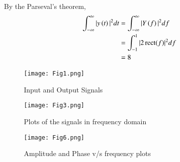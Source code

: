 \documentclass[journal,12pt,twocolumn]{IEEEtran}
\DeclareMathOperator{\rect}{rect}
\begin{document}
By the Parseval's theorem,
\begin{align}
    \int_{-\infty}^{\infty} |y\brak{t}|^{2} dt &= \int_{-\infty}^{\infty} |Y\brak{f}|^{2} df\\
    &= \int_{-1}^{1} |2\rect(f)|^2df\\
    &= 8
\end{align}
\begin{figure}[htp]
    \centering
    \texttt{[image: Fig1.png]}
    \caption{Input and Output Signals}
    \label{fig:plot}
\end{figure}
\begin{figure}[htp]
    \centering
    \texttt{[image: Fig3.png]}
    \caption{Plots of the signals in frequency domain}
    \label{fig:plot}
\end{figure}
\begin{figure}[htp]
    \centering
    \texttt{[image: Fig6.png]}
    \caption{Amplitude and Phase v/s frequency plots}
    \label{fig:plot}
\end{figure}
\end{document}
